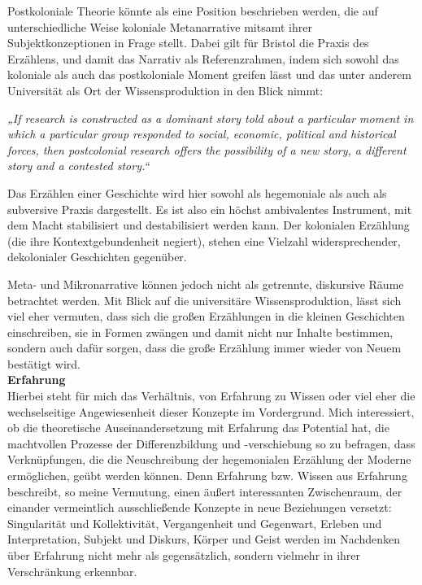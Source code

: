 Postkoloniale Theorie könnte als eine Position beschrieben werden, die  auf
unterschiedliche Weise  koloniale Metanarrative mitsamt ihrer
Subjektkonzeptionen in Frage stellt. Dabei gilt für Bristol die Praxis des
Erzählens, und damit das Narrativ als Referenzrahmen, indem sich sowohl das
koloniale als auch das postkoloniale Moment greifen lässt und das unter anderem
Universität als Ort der Wissensproduktion in den Blick nimmt:
\begin{myenv} \textit{  „If research is constructed as a dominant story told
    about a particular moment in which a particular group responded to social,
    economic, political and historical forces, then postcolonial research
    offers the possibility of a new story, a different story and a contested
story.“\footnotemark {} } \end{myenv}

Das Erzählen einer Geschichte wird hier sowohl als hegemoniale als auch als
subversive Praxis dargestellt. Es ist also ein höchst ambivalentes Instrument,
mit dem Macht stabilisiert und destabilisiert werden kann. Der kolonialen
Erzählung (die ihre Kontextgebundenheit negiert), stehen eine Vielzahl
widersprechender, dekolonialer Geschichten gegenüber.

Meta- und Mikronarrative können jedoch nicht als getrennte, diskursive Räume
betrachtet werden. Mit Blick auf die universitäre Wissensproduktion, lässt sich
viel eher vermuten, dass sich die großen Erzählungen in die kleinen Geschichten
einschreiben, sie in Formen zwängen und damit nicht nur Inhalte bestimmen,
sondern auch dafür sorgen, dass die große Erzählung immer wieder von Neuem
bestätigt wird.\\

\textbf{\large Erfahrung}\\

Hierbei steht für mich das Verhältnis, von Erfahrung zu Wissen oder viel eher
die wechselseitige Angewiesenheit dieser Konzepte im Vordergrund. Mich
interessiert, ob die theoretische Auseinandersetzung mit Erfahrung das
Potential hat, die machtvollen Prozesse der Differenzbildung und -verschiebung
so zu befragen, dass Verknüpfungen, die die Neuschreibung der hegemonialen
Erzählung der Moderne ermöglichen, geübt werden können. Denn Erfahrung bzw.
Wissen aus Erfahrung beschreibt, so meine Vermutung, einen äußert interessanten
Zwischenraum, der einander vermeintlich ausschließende Konzepte in neue
Beziehungen versetzt: Singularität und Kollektivität, Vergangenheit und
Gegenwart, Erleben und Interpretation, Subjekt und Diskurs, Körper und Geist
werden im Nachdenken über Erfahrung nicht mehr als gegensätzlich, sondern
vielmehr in ihrer Verschränkung erkennbar.

